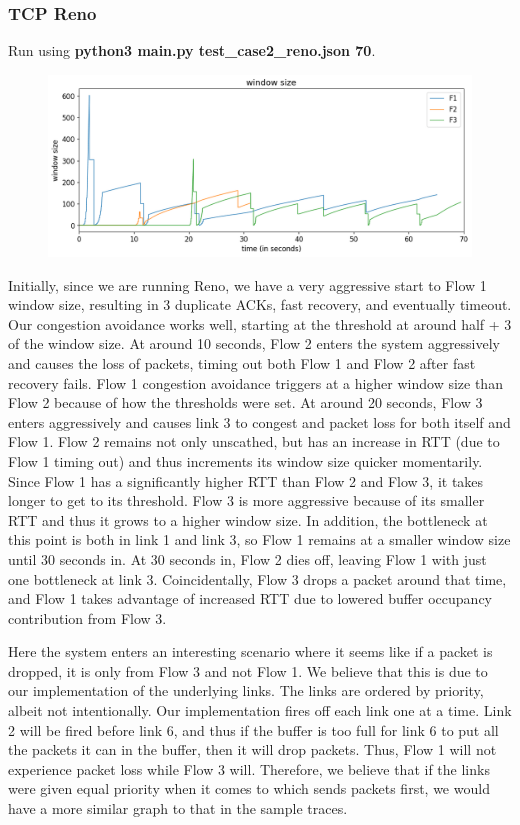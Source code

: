 \documentclass{article}
\begin{document}
\subsubsection{TCP Reno}

Run using \textbf{python3 main.py test\_case2\_reno.json 70}.

\begin{figure}[H]
\centering
\includegraphics[width = \textwidth]{test_case2_reno window size.png}
\end{figure}

Initially, since we are running Reno, we have a very aggressive start to Flow 1 window size, resulting in 3 duplicate ACKs, fast recovery, and eventually timeout. Our congestion avoidance works well, starting at the threshold at around half + 3 of the window size. At around 10 seconds, Flow 2 enters the system aggressively and causes the loss of packets, timing out both Flow 1 and Flow 2 after fast recovery fails. Flow 1 congestion avoidance triggers at a higher window size than Flow 2 because of how the thresholds were set. At around 20 seconds, Flow 3 enters aggressively and causes link 3 to congest and packet loss for both itself and Flow 1. Flow 2 remains not only unscathed, but has an increase in RTT (due to Flow 1 timing out) and thus increments its window size quicker momentarily. Since Flow 1 has a significantly higher RTT than Flow 2 and Flow 3, it takes longer to get to its threshold. Flow 3 is more aggressive because of its smaller RTT and thus it grows to a higher window size. In addition, the bottleneck at this point is both in link 1 and link 3, so Flow 1 remains at a smaller window size until 30 seconds in. At 30 seconds in, Flow 2 dies off, leaving Flow 1 with just one bottleneck at link 3. Coincidentally, Flow 3 drops a packet around that time, and Flow 1 takes advantage of increased RTT due to lowered buffer occupancy contribution from Flow 3. 

Here the system enters an interesting scenario where it seems like if a packet is dropped, it is only from Flow 3 and not Flow 1. We believe that this is due to our implementation of the underlying links. The links are ordered by priority, albeit not intentionally. Our implementation fires off each link one at a time. Link 2 will be fired before link 6, and thus if the buffer is too full for link 6 to put all the packets it can in the buffer, then it will drop packets. Thus, Flow 1 will not experience packet loss while Flow 3 will. Therefore, we believe that if the links were given equal priority when it comes to which sends packets first, we would have a more similar graph to that in the sample traces.
\end{document}

